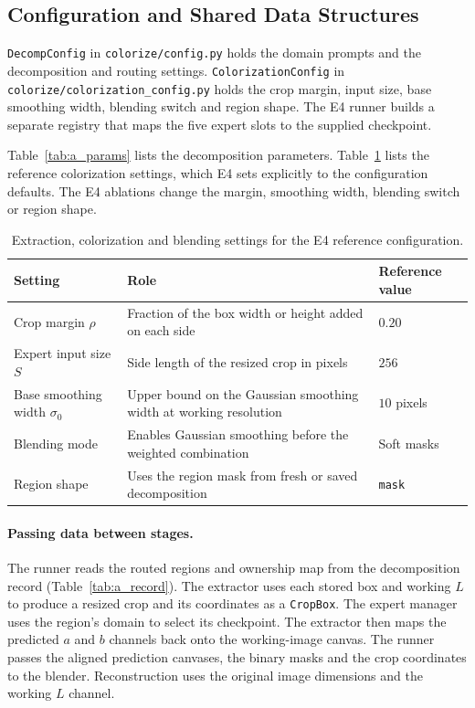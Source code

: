 \documentclass{FastFyp}
\begin{document}
\subsection{Configuration and Shared Data Structures}
\label{sec:b_configuration}
\texttt{DecompConfig} in \texttt{colorize/config.py} holds the domain prompts
and the decomposition and routing settings. \texttt{ColorizationConfig} in
\texttt{colorize/colorization\_config.py} holds the crop margin, input size,
base smoothing width, blending switch and region shape. The E4 runner
builds a separate registry that maps the five expert slots to the supplied
checkpoint.

Table~\ref{tab:a_params} lists the decomposition parameters.
Table~\ref{tab:b_pipeline_params} lists the reference colorization settings,
which E4 sets explicitly to the configuration defaults. The E4 ablations
change the margin, smoothing width, blending switch or region shape.

\begin{table}[!ht]
\centering
\caption{Extraction, colorization and blending settings for the E4 reference configuration.}
\label{tab:b_pipeline_params}
\begin{tabular}{|p{3.1cm}|p{6.4cm}|p{2.5cm}|}
\hline
\textbf{Setting} & \textbf{Role} & \textbf{Reference value} \\ \hline
Crop margin $\rho$ & Fraction of the box width or height added on each side & $0.20$ \\ \hline
Expert input size $S$ & Side length of the resized crop in pixels & $256$ \\ \hline
Base smoothing width $\sigma_0$ & Upper bound on the Gaussian smoothing width at working resolution & $10$ pixels \\ \hline
Blending mode & Enables Gaussian smoothing before the weighted combination & Soft masks \\ \hline
Region shape & Uses the region mask from fresh or saved decomposition & \texttt{mask} \\ \hline
\end{tabular}
\end{table}

\paragraph{Passing data between stages.} The runner reads the routed regions and
ownership map from the decomposition record (Table~\ref{tab:a_record}). The
extractor uses each stored box and working $L$ to produce a resized crop and
its coordinates as a \texttt{CropBox}. The expert manager uses the region's
domain to select its checkpoint. The extractor then maps the predicted $a$
and $b$ channels back onto the working-image canvas. The runner passes the
aligned prediction canvases, the binary masks and the crop coordinates to
the blender. Reconstruction uses the original image dimensions and the
working $L$ channel.
\end{document}
